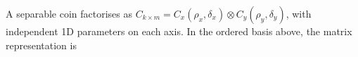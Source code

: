 A separable coin factorises as \(C_{k \times m} = C_x(\rho_x,
\delta_x) \otimes C_y(\rho_y, \delta_y)\), with independent 1D
parameters on each axis. In the ordered basis above, the matrix representation is
